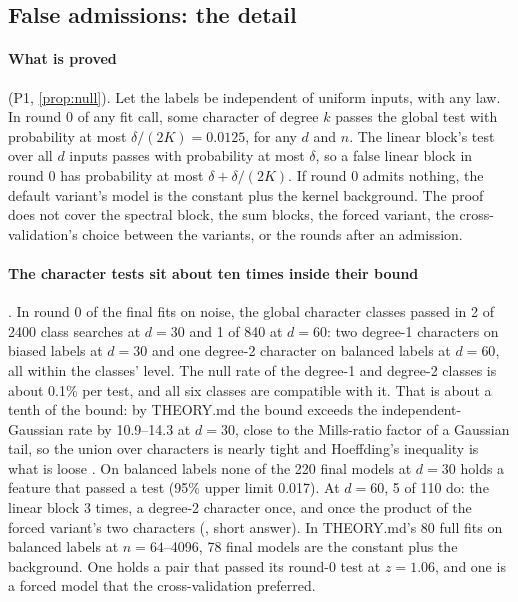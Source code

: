 \subsection{False admissions: the detail}\label{app:interp-calib}

\paragraph{What is proved}  (P1, \cref{prop:null}). Let the labels be independent of uniform inputs, with any law. In round 0 of any fit call, some character of degree $k$ passes the global test with probability at most $\delta/(2K)=0.0125$, for any $d$ and $n$. The linear block's test over all $d$ inputs passes with probability at most $\delta$, so a false linear block in round 0 has probability at most $\delta+\delta/(2K)$. If round 0 admits nothing, the default variant's model is the constant plus the kernel background. The proof does not cover the spectral block, the sum blocks, the forced variant, the cross-validation's choice between the variants, or the rounds after an admission.

\paragraph{The character tests sit about ten times inside their bound} . In round 0 of the final fits on noise, the global character classes passed in 2 of 2400 class searches at $d=30$ and 1 of 840 at $d=60$: two degree-1 characters on biased labels at $d=30$ and one degree-2 character on balanced labels at $d=60$, all within the classes' level. The null rate of the degree-1 and degree-2 classes is about 0.1\% per test, and all six classes are compatible with it. That is about a tenth of the bound: by THEORY.md the bound exceeds the independent-Gaussian rate by 10.9--14.3 at $d=30$, close to the Mills-ratio factor of a Gaussian tail, so the union over characters is nearly tight and Hoeffding's inequality is what is loose . On balanced labels none of the 220 final models at $d=30$ holds a feature that passed a test (95\% upper limit 0.017). At $d=60$, 5 of 110 do: the linear block 3 times, a degree-2 character once, and once the product of the forced variant's two characters (, short answer). In THEORY.md's 80 full fits on balanced labels at $n=64$--4096, 78 final models are the constant plus the background. One holds a pair that passed its round-0 test at $z=1.06$, and one is a forced model that the cross-validation preferred.

